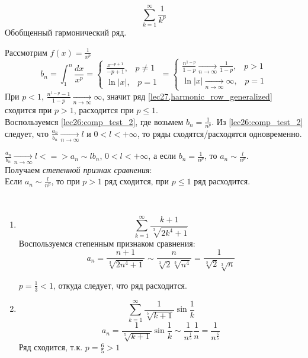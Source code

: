 \documentclass[../../main.tex]{subfiles}
\begin{document}
	\begin{iex}
		
		\begin{equation}  \sum_{k = 1}^{\infty} \frac{1}{k^p}  \label{lec27,harmonic_row_generalized}  \end{equation}
		Обобщенный гармонический ряд.
		
		Рассмотрим $f(x) = \frac{1}{x^p}$
		\[ b_n = \int_{1}^{n} \frac{dx}{x^p} = \begin{cases} \frac{x^{-p + 1}}{-p + 1} , \; \;\; p \ne 1  \\  \ln{|x|}, \; \; \; p = 1 \end{cases} =  \begin{cases} \frac{n^{1-p}}{1-p } \underset{n \rightarrow \infty}
		{\longrightarrow} \frac{1}{1-p} , \; \;\; p > 1  \\  \ln{|x|} \underset{n \rightarrow \infty}
		{\longrightarrow} \infty , \; \; \; p = 1 \end{cases} \]
		При $p < 1$, $\frac{n^{1-p} - 1}{1-p} \underset{n \rightarrow \infty}
		{\longrightarrow} \infty $, значит ряд \ref{lec27,harmonic_row_generalized} сходится при $p>1$, расходится при $p \le 1$.\\
		Воспользуемся \ref{lec26:comp_test_2}, где возьмем $b_n = \frac{1}{n^p}$. Из \ref{lec26:comp_test_2} следует, что  $\frac{a_n}{b_n} \underset{n \rightarrow \infty} {\longrightarrow} l $ и $0 < l < +\infty$, то ряды сходятся/расходятся одновременно.
		
		$\frac{a_n}{b_n} \underset{n \rightarrow \infty} {\longrightarrow} l <=> a_n \sim l b_n$, $0 < l < +\infty$, а если $b_n = \frac{1}{n^p}$, то $a_n \sim \frac{l}{n^p}$.\\		
		Получаем \emph{степенной признак сравнения}:\\		
		Если $a_n \sim \frac{l}{n^p}$, то при $p>1$ ряд сходится, при $p \le 1$ ряд расходится.
	\end{iex}	

	\begin{examples}
		~
	\begin{enumerate}[label=\arabic*)]	
		\item \[ \sum_{k = 1}^{\infty} \frac{k+1}{\sqrt[3]{2k^4 + 1}}  \]
		Воспользуемся степенным признаком сравнения:
		\[ a_n = \frac{n+1}{\sqrt[3]{2n^4 + 1}} \sim \frac{n}{\sqrt[3]{2} \sqrt[3]{n^4}} = \frac{1}{\sqrt[3]{2} \sqrt[3]{n}}          \]
		
		$p = \frac{1}{3} < 1$, откуда следует, что ряд расходится. 
		\item \[ \sum_{k=1}^{\infty} \frac{1}{\sqrt[5]{k+1}} \sin{\frac{1}{k}}  \]
		\[  a_n =  \frac{1}{\sqrt[5]{k+1}} \sin{\frac{1}{k}} \sim \frac{1}{n^{\frac{1}{5}} }  \frac{1}{n} =  \frac{1}{n^{\frac{6}{5}} }        \]
		Ряд сходится, т.к. $p = \frac{6}{5} > 1$
	\end{enumerate}	
	\end{examples}	
\end{document}
